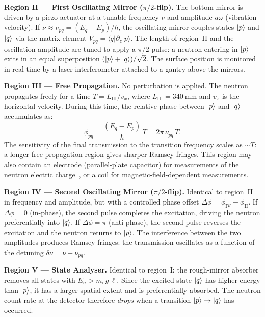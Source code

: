 \documentclass[a4paper,headsepline,oneside,11pt]{scrartcl}
\begin{document}
\vspace{0.5em}
\textbf{Region II --- First Oscillating Mirror ($\pi/2$-flip).}
The bottom mirror is driven by a piezo actuator at a tunable
frequency $\nu$ and amplitude $a\omega$ (vibration velocity).
If $\nu \approx \nu_{pq} = (E_q - E_p)/h$, the oscillating mirror
couples states $\ket{p}$ and $\ket{q}$ via the matrix element
$V_{pq} = \langle q|\partial_z|p\rangle$.
The length of region~II and the oscillation amplitude are tuned to
apply a $\pi/2$-pulse: a neutron entering in $\ket{p}$ exits in an
equal superposition $(\ket{p} + \ket{q})/\sqrt{2}$.
The surface position is monitored in real time by a laser
interferometer attached to a gantry above the mirrors.

\vspace{0.5em}
\textbf{Region III --- Free Propagation.}
No perturbation is applied.
The neutron propagates freely for a time $T = L_\mathrm{III}/v_x$,
where $L_\mathrm{III} = \SI{340}{\milli\metre}$ and $v_x$ is the horizontal
velocity.
During this time, the relative phase between $\ket{p}$ and $\ket{q}$
accumulates as:
\begin{equation}
  \phi_{pq} = \frac{(E_q - E_p)}{\hbar}\,T
             = 2\pi\,\nu_{pq}\,T.
  \label{eq:ramsey_phase}
\end{equation}
The sensitivity of the final transmission to the transition frequency
scales as $\sim T$: a longer free-propagation region gives sharper
Ramsey fringes.
This region may also contain an electrode (parallel-plate capacitor)
for measurements of the neutron electric charge~\cite{Bosina2023},
or a coil for magnetic-field-dependent measurements.

\vspace{0.5em}
\textbf{Region IV --- Second Oscillating Mirror ($\pi/2$-flip).}
Identical to region~II in frequency and amplitude, but with a
controlled phase offset $\Delta\phi = \phi_\mathrm{IV} -
\phi_\mathrm{II}$.
If $\Delta\phi = 0$ (in-phase), the second pulse completes the
excitation, driving the neutron preferentially into $\ket{q}$.
If $\Delta\phi = \pi$ (anti-phase), the second pulse reverses the
excitation and the neutron returns to $\ket{p}$.
The interference between the two amplitudes produces Ramsey
fringes: the transmission oscillates as a function of the detuning
$\delta\nu = \nu - \nu_{pq}$.

\vspace{0.5em}
\textbf{Region V --- State Analyser.}
Identical to region~I: the rough-mirror absorber removes all states
with $E_n > m_\mathrm{n} g\,\ell$.
Since the excited state $\ket{q}$ has higher energy than $\ket{p}$,
it has a larger spatial extent and is preferentially absorbed.
The neutron count rate at the detector therefore \emph{drops} when a
transition $\ket{p} \to \ket{q}$ has occurred.
\end{document}
